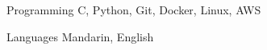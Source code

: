 

\begin{cvskills}

  \cvskill
    {Programming} %
    {C, Python, Git, Docker, Linux, AWS} %

  \cvskill
    {Languages} %
    {Mandarin, English} %

\end{cvskills}
